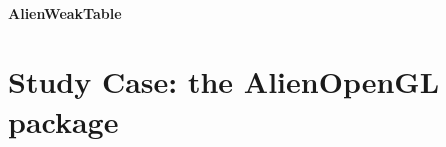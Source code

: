 \documentclass[a4paper,10pt,twoside]{book}
\begin{document}
\paragraph{AlienWeakTable}

% 
% 

\section{Study Case: the AlienOpenGL package} \label{sec:example_the_alienopengl_package} %


\ifx\wholebook\relax\else
\end{document}
